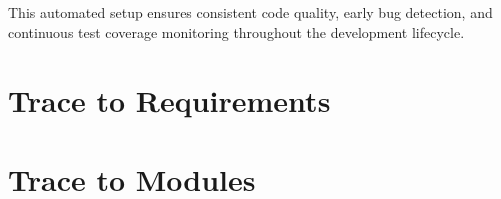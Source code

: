 \documentclass[12pt, titlepage]{article}
\begin{document}
This automated setup ensures consistent code quality, early bug detection, and
continuous test coverage monitoring throughout the development lifecycle.

\newpage

\section{Trace to Requirements\label{sec:T2R}}

\begin{table}[htbp!]
  \centering
  \caption{Traceability Matrix Showing the Connections Between Requirements and System Test Cases}
  \label{Table:tc_trace}
\end{table}
		
\section{Trace to Modules\label{sec:T2M}}		
\end{document}
